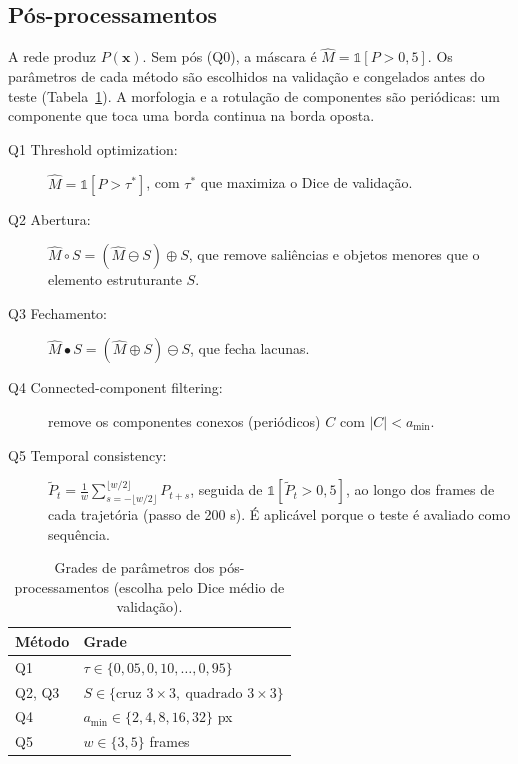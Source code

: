\subsection{Pós-processamentos}
\label{sec:pos}
A rede produz $P(\mathbf{x})$. Sem pós (Q0), a máscara é $\hat{M} = \mathbb{1}[P>0{,}5]$. Os
parâmetros de cada método são escolhidos na validação e congelados antes do teste
(Tabela~\ref{tab:grades}). A morfologia \cite{serra1982,soille2003} e a rotulação de componentes
são periódicas: um componente que toca uma borda continua na borda oposta.
\begin{description}
  \item[Q1 Threshold optimization:] $\hat{M} = \mathbb{1}[P > \tau^*]$, com $\tau^*$ que maximiza o
    Dice de validação.
  \item[Q2 Abertura:] $\hat{M}\circ S = (\hat{M}\ominus S)\oplus S$, que remove saliências e objetos
    menores que o elemento estruturante $S$.
  \item[Q3 Fechamento:] $\hat{M}\bullet S = (\hat{M}\oplus S)\ominus S$, que fecha lacunas.
  \item[Q4 Connected-component filtering:] remove os componentes conexos (periódicos) $C$ com
    $|C| < a_{\min}$.
  \item[Q5 Temporal consistency:] $\tilde{P}_t = \frac{1}{w}\sum_{s=-\lfloor w/2\rfloor}^{\lfloor w/2\rfloor} P_{t+s}$,
    seguida de $\mathbb{1}[\tilde{P}_t>0{,}5]$, ao longo dos frames de cada trajetória (passo de
    200 s). É aplicável porque o teste é avaliado como sequência.
\end{description}

\begin{table}[t]\centering\small
\caption{Grades de parâmetros dos pós-processamentos (escolha pelo Dice médio de validação).}
\label{tab:grades}
\begin{tabular}{ll}
\toprule
Método & Grade \\
\midrule
Q1 & $\tau\in\{0{,}05, 0{,}10, \dots, 0{,}95\}$ \\
Q2, Q3 & $S\in\{\text{cruz } 3\times3,\ \text{quadrado } 3\times3\}$ \\
Q4 & $a_{\min}\in\{2,4,8,16,32\}$ px \\
Q5 & $w\in\{3,5\}$ frames \\
\bottomrule
\end{tabular}
\end{table}

